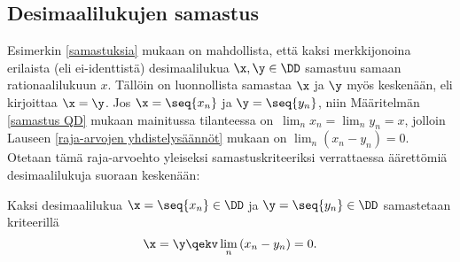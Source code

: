 \subsection{Desimaalilukujen samastus}

Esimerkin \ref{samastuksia} mukaan on mahdollista, että kaksi merkkijonoina erilaista
(eli ei-identtistä) desimaalilukua $\x,\y\in\DD$ samastuu samaan rationaalilukuun $x$. Tällöin
on luonnollista samastaa $\x$ ja $\y$ myös keskenään, eli kirjoittaa $\x=\y$. Jos $\x=\seq{x_n}$
ja $\y=\seq{y_n}$, niin Määritelmän \ref{samastus QD} mukaan mainitussa tilanteessa on
$\,\lim_n x_n = \lim_n y_n = x$, jolloin Lauseen \ref{raja-arvojen yhdistelysäännöt} mukaan on
$\lim_n (x_n-y_n) = 0$. Otetaan tämä raja-arvoehto yleiseksi samastuskriteeriksi verrattaessa 
äärettömiä desimaalilukuja suoraan keskenään:
\begin{Def} \label{samastus DD}  Kaksi
desimaalilukua $\x = \seq{x_n} \in \DD$ ja $\y = \seq{y_n} \in \DD$ samastetaan kriteerillä
\[
\x = \y \qekv \lim_n\,(x_n - y_n) = 0.
\] 
\end{Def}

